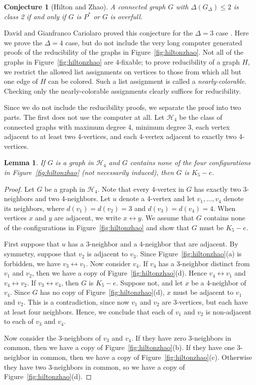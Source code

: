 \documentclass[12pt]{article}
\theoremstyle{plain}
\newtheorem{lem}[thm]{Lemma}
\newtheorem{conjecture}[thm]{Conjecture}
\theoremstyle{definition}
\theoremstyle{remark}
\newcommand{\fancy}[1]{\mathcal{#1}}
\def\adj{\leftrightarrow}
\def\H{\fancy{H}}
\begin{document}
\begin{conjecture}[Hilton and Zhao]
A connected graph $G$ with $\Delta(G_\Delta) \le 2$ is class 2 if and only if $G$ is $P^*$ or $G$ is overfull.
\end{conjecture}

David and Gianfranco Cariolaro proved this conjecture for the $\Delta=3$ case \cite{cariolaro2003colouring}.  Here we prove the $\Delta=4$ case, but do not include the very long computer generated proofs of the reducibility of the graphs in Figure~\ref{fig:hiltonzhao}.  Not all of the graphs in Figure~\ref{fig:hiltonzhao} are $4$-fixable; to prove reducibility of a graph $H$, we restrict the allowed list assignments on vertices to those from which all but one edge of $H$ can be colored.  Such a list assignment is called a \emph{nearly-colorable}.  Checking only the nearly-colorable assignments clearly suffices for reducibility.


Since we do not include the reducibility proofs, we separate the proof into two parts.  The first does not use the computer at all.
Let $\H_4$ be the class of connected graphs with maximum degree 4, minimum
degree 3, each vertex adjacent to at least two 4-vertices, and each 4-vertex
adjacent to exactly two 4-vertices.
\begin{lem}\label{HiltonZhaoLemma}
	If $G$ is a graph in $\H_4$ and $G$ contains none of the four configurations in Figure~\ref{fig:hiltonzhao}
	(not necessarily induced), then $G$ is $K_5-e$.
\end{lem}
\begin{proof}
	Let $G$ be a graph in $\H_4$.  Note that every 4-vertex in $G$ has exactly two
	3-neighbors and two 4-neighbors.
	Let $u$ denote a 4-vertex and let $v_1,\ldots,v_4$ denote its neighbors, where
	$d(v_1)=d(v_2)=3$ and $d(v_3)=d(v_4)=4$.
	When vertices $x$ and $y$ are adjacent, we write $x\adj y$.
	We assume that $G$ contains none of the configurations in Figure~\ref{fig:hiltonzhao} and show that
	$G$ must be $K_5-e$.  
	
	First suppose that $u$ has a 3-neighbor and a 4-neighbor that are adjacent.  By
	symmetry, suppose that $v_2$ is adjacent to $v_3$.  Since Figure~\ref{fig:hiltonzhao}(a) is forbidden,
	we have $v_3\adj v_1$. 
	Now consider $v_4$.  If $v_4$ has a 3-neighbor distinct from $v_1$ and $v_2$,
	then we have a copy of Figure~\ref{fig:hiltonzhao}(d).  Hence $v_4\adj v_1$ and $v_4\adj v_2$.
	If $v_3\adj v_4$, then $G$ is $K_5-e$.  Suppose not, and let $x$ be a 4-neighbor
	of $v_4$.  Since $G$ has no copy of Figure~\ref{fig:hiltonzhao}(d), $x$ must be adjacent to $v_1$ and
	$v_2$.  This is a contradiction, since now $v_1$ and $v_2$ are 3-vertices, but
	each have at least four neighbors.  Hence, we conclude that each of $v_1$ and
	$v_2$ is non-adjacent to each of $v_3$ and $v_4$.
	
	Now consider the 3-neighbors of $v_3$ and $v_4$.  
	If they have zero 3-neighbors in common, then we have a copy of Figure~\ref{fig:hiltonzhao}(b).  
	If they have one 3-neighbor in common, then we have a copy of Figure~\ref{fig:hiltonzhao}(c).
	Otherwise they have two 3-neighbors in common, so we have a copy of Figure~\ref{fig:hiltonzhao}(d).  
\end{proof}
\end{document}
